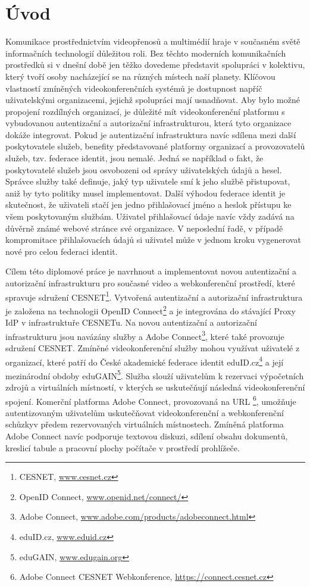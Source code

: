 \documentclass[
  printed, %
  twoside, %
  table,   %
  nolof,     %
  nolot,     %
]{fithesis3}
\begin{document}
\chapter{Úvod}
Komunikace prostřednictvím videopřenosů a multimédií hraje v současném světě informačních technologií důležitou roli. Bez těchto moderních komunikačních prostředků si v dnešní době jen těžko dovedeme představit spolupráci v kolektivu, který tvoří osoby nacházející se na různých místech naší planety. Klíčovou vlastností zmíněných videokonferenčních systémů je dostupnost napříč uživatelskými organizacemi, jejichž spolupráci mají usnadňovat. Aby bylo možné propojení rozdílných organizací, je důležité mít videokonferenční platformu s vybudovanou autentizační a autorizační infrastrukturou, která tyto organizace dokáže integrovat. Pokud je autentizační infrastruktura navíc sdílena mezi další poskytovatele služeb, benefity představované platformy organizací a provozovatelů služeb, tzv. federace identit, jsou nemalé. Jedná se například o fakt, že poskytovatelé služeb jsou osvobozeni od správy uživatelských údajů a hesel. Správce služby také definuje, jaký typ uživatele smí k jeho službě přistupovat, aniž by tyto politiky musel implementovat. Další výhodou federace identit je skutečnost, že uživateli stačí jen jedno přihlašovací jméno a heslo\break k přístupu ke všem poskytovaným službám. Uživatel přihlašovací údaje navíc vždy zadává na důvěrně známé webové stránce své organizace. V neposlední řadě, v případě kompromitace  přihlašovacích údajů si uživatel může v jednom kroku vygenerovat nové pro celou federaci identit. 

Cílem této diplomové práce je navrhnout a implementovat novou autentizační a autorizační infrastrukturu pro současné video a webkonferenční prostředí, které spravuje sdružení CESNET\footnote{CESNET, \url{www.cesnet.cz}}. Vytvořená autentizační a autorizační infrastruktura je založena na technologii OpenID Connect\footnote{OpenID Connect, \url{www.openid.net/connect/}}  a je integrována do stávající Proxy IdP v infrastruktuře CESNETu. Na novou autentizační a autorizační infrastrukturu jsou navázány služby  a Adobe Connect\footnote{Adobe Connect, \url{www.adobe.com/products/adobeconnect.html}}, které také provozuje sdružení CESNET. Zmíněné videokonferenční služby mohou využívat uživatelé z organizací, které patří do České akademické federace identit eduID.cz\footnote{eduID.cz, \url{www.eduid.cz}} a její mezinárodní obdoby eduGAIN\footnote{eduGAIN, \url{www.edugain.org}}. Služba  slouží uživatelům k rezervaci výpočetních zdrojů a virtuálních místností, v kterých se uskutečňují následná videokonferenční spojení. Komerční platforma Adobe Connect, provozovaná na URL \footnote{Adobe Connect CESNET Webkonference, \url{https://connect.cesnet.cz}}, umožňuje autentizovaným uživatelům uskutečňovat videokonferenční a webkonferenční schůzky\break v předem rezervovaných virtuálních místnostech. Zmíněná platforma Adobe Connect navíc podporuje textovou diskuzi, sdílení obsahu dokumentů, kreslicí tabule a pracovní plochy počítače v prostředí prohlížeče. 
\end{document}
